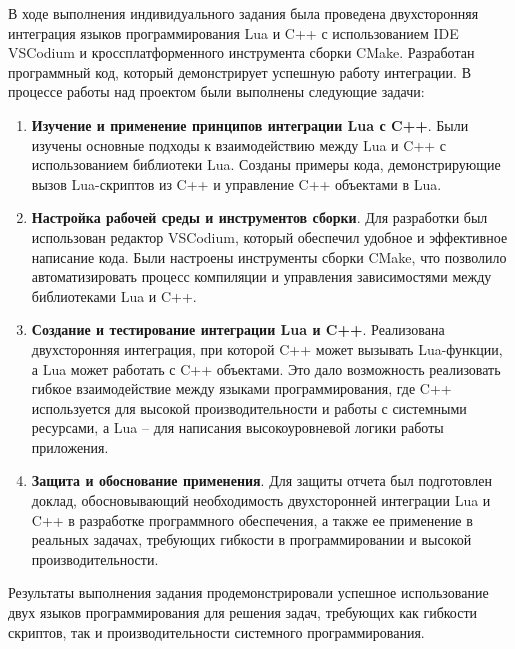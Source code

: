 
В ходе выполнения индивидуального задания была проведена двухсторонняя интеграция языков программирования Lua и C++ с использованием IDE VSCodium и кроссплатформенного инструмента сборки CMake. Разработан программный код, который демонстрирует успешную работу интеграции. В процессе работы над проектом были выполнены следующие задачи:

\begin{enumerate}
	\item \textbf{Изучение и применение принципов интеграции Lua с C++}. Были изучены основные подходы к взаимодействию между Lua и C++ с использованием библиотеки Lua. Созданы примеры кода, демонстрирующие вызов Lua-скриптов из C++ и управление C++ объектами в Lua.

	\item \textbf{Настройка рабочей среды и инструментов сборки}. Для разработки был использован редактор VSCodium, который обеспечил удобное и эффективное написание кода. Были настроены инструменты сборки CMake, что позволило автоматизировать процесс компиляции и управления зависимостями между библиотеками Lua и C++.

	\item \textbf{Создание и тестирование интеграции Lua и C++}. Реализована двухсторонняя интеграция, при которой C++ может вызывать Lua-функции, а Lua может работать с C++ объектами. Это дало возможность реализовать гибкое взаимодействие между языками программирования, где C++ используется для высокой производительности и работы с системными ресурсами, а Lua -- для написания высокоуровневой логики работы приложения.

	\item \textbf{Защита и обоснование применения}. Для защиты отчета был подготовлен доклад, обосновывающий необходимость двухсторонней интеграции Lua и C++ в разработке программного обеспечения, а также ее применение в реальных задачах, требующих гибкости в программировании и высокой производительности.
\end{enumerate}

Результаты выполнения задания продемонстрировали успешное использование двух языков программирования для решения задач, требующих как гибкости скриптов, так и производительности системного программирования.

\clearpage